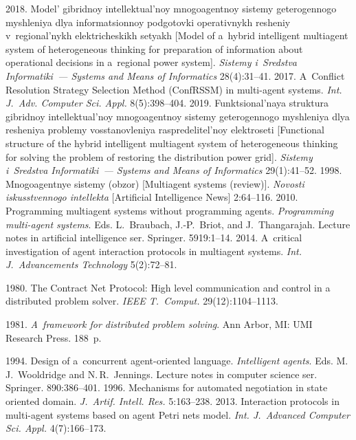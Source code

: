 \begin{multicols}{2}
{{\begin{thebibliography}{99}
 2018. Model' gibridnoy intellektual'noy 
mnogoagentnoy sistemy geterogennogo myshleniya dlya informatsionnoy 
podgotovki operativnykh resheniy v~regional'nykh elektricheskikh setyakh [Model of 
a~hybrid intelligent multiagent system of heterogeneous thinking for preparation of 
information about operational decisions in a~regional power system]. \textit{Sistemy 
i~Sredstva Informatiki~--- Systems and Means of Informatics} 28(4):31--41.
 2017. A~Conflict Resolution Strategy 
Selection Method (ConfRSSM) in multi-agent systems. \textit{Int. 
J.~Adv. Computer Sci. Appl.} 8(5):398--404.
 2019. Funk\-tsi\-o\-nal'\-naya struktura 
gibridnoy intellektual'noy mno\-go\-agent\-noy sistemy geterogennogo myshleniya dlya 
resheniya problemy vosstanovleniya raspredelitel'noy elektroseti [Functional 
structure of the hybrid intelligent multiagent system of heterogeneous thinking for 
solving the problem of restoring the distribution power grid]. \textit{Sistemy i~Sredstva 
Informatiki~--- Systems and Means of Informatics} 29(1):41--52.
 1998. 
Mno\-go\-agent\-nye 
sistemy (obzor) [Multiagent systems (review)]. 
\textit{Novosti iskusstvennogo intellekta} [Artificial Intelligence News] 2:64--116.
 2010. Programming multiagent systems 
without programming agents. \textit{Programming multi-agent systems}.  
Eds. L.~Braubach, J.-P.~Briot, and J.~Thangarajah.
Lecture  notes in artificial intelligence ser. Springer. 5919:1--14. 
 2014. A~critical investigation of agent 
interaction protocols in multiagent systems. \textit{Int. J.~Advancements 
Technology} 5(2):72--81.

 1980. The Contract Net Protocol: High level communication and 
control in a distributed problem solver. \textit{IEEE T.~Comput.} 29(12):1104--1113.

 1981. \textit{A~framework for distributed problem solving}. 
Ann Arbor, MI: UMI Research Press. 188~p.

 1994. Design of 
a~concurrent agent-oriented language. 
\textit{Intelligent agents}. Eds. M.\,J.~Wooldridge and N.\,R.~Jennings.
  Lecture notes in computer science ser. Springer. 890:386--401.
 1996. Mechanisms for automated 
negotiation in state oriented domain. \textit{J.~Artif. Intell. Res.} 
5:163--238.
 2013. Interaction protocols in multi-agent 
systems based on agent Petri nets model. \textit{Int. J.~Advanced 
Computer Sci. Appl.} 4(7):166--173.


\end{thebibliography}}}
\end{multicols}
